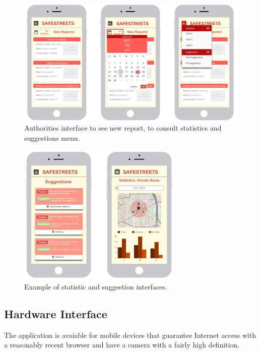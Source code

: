 \documentclass{report}
\begin{document}
\begin{figure}[!ht]
	\begin{center}
	\includegraphics[width=\textwidth]{img/AuthoritiesInterface.png}
	\end{center}
	\caption{Authorities interface to see new report, to consult statistics and suggestions menu.}
\end{figure}

\begin{figure}[!ht]
	\begin{center}
	\includegraphics[width=0.7\textwidth]{img/StatisticsInterfaces.jpg}
	\end{center}
	\caption{Example of statistic and suggestion interfaces.}
\end{figure}

\subsection{Hardware Interface}
The application is avaiable for mobile devices that guarantee Internet access with a reasonably recent browser and have a camera with a fairly high definition.
\end{document}

